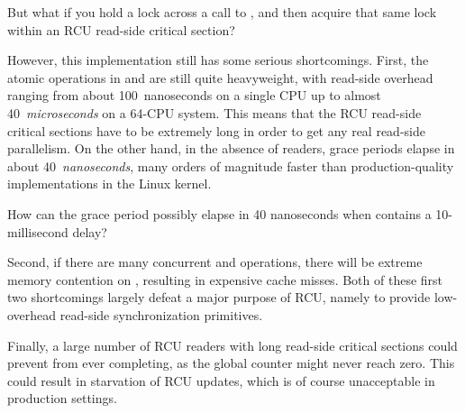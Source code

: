 \QuickQuiz{}
	But what if you hold a lock across a call to
	, and then acquire that same lock within
	an RCU read-side critical section?
 \QuickQuizEnd

However, this implementation still has some serious shortcomings.
First, the atomic operations in  and
 are still quite  heavyweight,
with read-side overhead ranging from about 100~nanoseconds on
a single  CPU up to almost 40~\emph{microseconds}
on a 64-CPU system.
This means that the RCU read-side critical sections
have to be extremely long in order to get any real
read-side parallelism.
On the other hand, in the absence of readers, grace periods elapse
in about 40~\emph{nanoseconds}, many orders of magnitude faster
than production-quality implementations in the Linux kernel.

\QuickQuiz{}
	How can the grace period possibly elapse in 40 nanoseconds when
	 contains a 10-millisecond delay?
 \QuickQuizEnd

Second, if there are many concurrent 
and  operations, there will
be extreme memory contention on ,
resulting in expensive cache misses.
Both of these first two shortcomings largely defeat a major purpose of
RCU, namely to provide low-overhead read-side synchronization primitives.

Finally, a large number of RCU readers with long read-side
critical sections could prevent 
from ever completing, as the global counter might
never reach zero.
This could result in starvation of RCU updates, which
is of course unacceptable in production settings.

